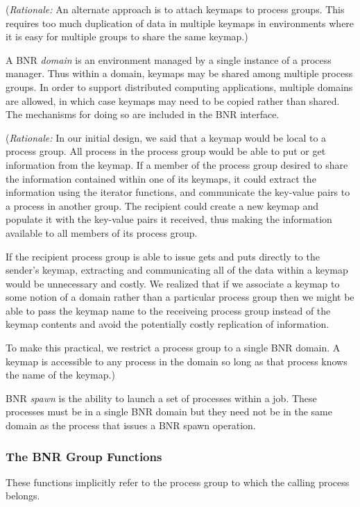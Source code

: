 \documentclass{article}
\begin{document}
({\em Rationale:\/}  An alternate approach is to attach keymaps to process
groups.  This requires too much duplication of data in multiple keymaps in
environments where it is easy for multiple groups to share the same keymap.)

A BNR {\em domain\/} is an environment managed by a single instance of a
process manager.  Thus within a domain, keymaps may be shared among multiple
process groups.  In order to support distributed computing applications,
multiple domains are allowed, in which case keymaps may need to be copied
rather than shared.  The mechanisms for doing so are included in the BNR
interface. 

({\em Rationale:\/}  In our initial design, we said that a keymap would be
local to a process group.  All process in the process group would be able to
put or get information from the keymap.  If a member of
the process group desired to share the information contained within one of its
keymaps, it could extract the information using the iterator functions, and
communicate the key-value pairs to a process in another group.  The recipient 
could create a new keymap and populate it with the key-value pairs it
received, thus making the information available to all members of its process
group.

If the recipient process group is able to issue gets and puts directly to the sender's
keymap, extracting and communicating all of the data
within a keymap would be unnecessary and costly.  We realized that if we
associate a keymap to some notion of a domain rather than a particular
process group then we might be able to pass the keymap name to the receiveing 
process group instead of the keymap contents and avoid the potentially costly
replication of information.

To make this practical, we restrict a process group to a single BNR domain.  A
keymap is accessible to any process in the domain so long as that process
knows the name of the keymap.)

BNR {\em spawn\/} is the ability to launch a set of processes within a job.  These
processes must be in a single BNR domain but they need not be in the same domain
as the process that issues a BNR spawn operation.

\subsubsection{The BNR Group Functions}
\label{sec:bnr-basic}

These functions implicitly refer to the process group to which the calling
process belongs. 
\end{document}
